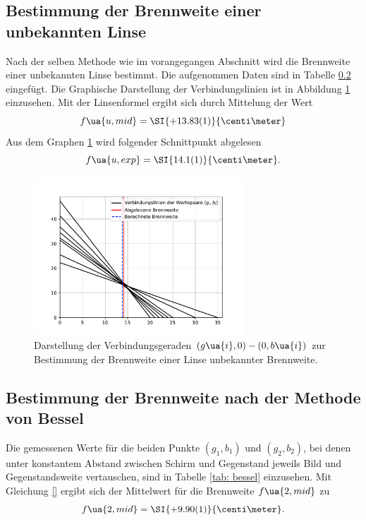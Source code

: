 \subsection{Bestimmung der Brennweite einer unbekannten Linse}
Nach der selben Methode wie im vorangegangen Abschnitt wird die Brennweite einer unbekannten Linse bestimmt.
Die aufgenommen Daten sind in Tabelle \ref{} eingefügt. Die Graphische Darstellung der Verbindungslinien ist
in Abbildung \ref{fig: wasserlinse} einzusehen. Mit der Linsenformel ergibt sich durch Mittelung der Wert
\begin{equation}
  f\ua{u, mid} = \SI{+13.83(1)}{\centi\meter}
\end{equation}
Aus dem Graphen \ref{fig: wasserlinse} wird folgender Schnittpunkt abgelesen
\begin{equation}
  f\ua{u, exp} = \SI{14.1(1)}{\centi\meter}.
\end{equation}

\begin{figure}
  \centering
  \includegraphics[width = 0.7\textwidth]{../Messdaten/plots/wasserlinse.pdf}
  \caption{Darstellung der Verbindungsgeraden $(g\ua{i}, 0) - (0, b\ua{i})$ zur Bestimmung der Brennweite einer
  Linse unbekannter Brennweite.}
  \label{fig: wasserlinse}
\end{figure}

\subsection{Bestimmung der Brennweite nach der Methode von Bessel}
Die gemessenen Werte für die beiden Punkte $(g_1, b_1)$ und $(g_2, b_2)$, bei denen unter konstantem Abstand
zwischen Schirm und Gegenstand jeweils Bild und Gegenstandsweite
vertauschen, sind in Tabelle \ref{tab: bessel} einzusehen. Mit Gleichung \eqref{} ergibt sich der Mittelwert für
die Brennweite $f\ua{2, mid}$ zu
\begin{equation}
  f\ua{2, mid} = \SI{+9.90(1)}{\centi\meter}.
\end{equation}




